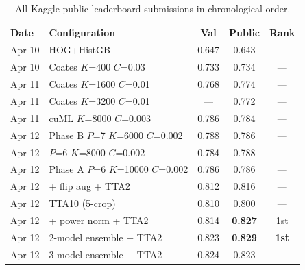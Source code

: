 \documentclass[11pt,a4paper]{article}
\begin{document}
\begin{table}[H]
\centering
\caption{All Kaggle public leaderboard submissions in chronological order.}
\label{tab:submissions}
\small
\begin{tabular}{@{}llccc@{}}
\toprule
Date & Configuration & Val & Public & Rank \\
\midrule
Apr 10 & HOG+HistGB & 0.647 & 0.643 & --- \\
Apr 10 & Coates $K$=400 $C$=0.03 & 0.733 & 0.734 & --- \\
Apr 11 & Coates $K$=1600 $C$=0.01 & 0.768 & 0.774 & --- \\
Apr 11 & Coates $K$=3200 $C$=0.01 & --- & 0.772 & --- \\
Apr 11 & cuML $K$=8000 $C$=0.003 & 0.786 & 0.784 & --- \\
Apr 12 & Phase B $P$=7 $K$=6000 $C$=0.002 & 0.788 & 0.786 & --- \\
Apr 12 & $P$=6 $K$=8000 $C$=0.002 & 0.784 & 0.788 & --- \\
Apr 12 & Phase A $P$=6 $K$=10000 $C$=0.002 & 0.786 & 0.786 & --- \\
Apr 12 & + flip aug + TTA2 & 0.812 & 0.816 & --- \\
Apr 12 & TTA10 (5-crop) & 0.810 & 0.800 & --- \\
Apr 12 & + power norm + TTA2 & 0.814 & \textbf{0.827} & 1st \\
Apr 12 & 2-model ensemble + TTA2 & 0.823 & \textbf{0.829} & \textbf{1st} \\
Apr 12 & 3-model ensemble + TTA2 & 0.824 & 0.823 & --- \\
\bottomrule
\end{tabular}
\end{table}
\end{document}
